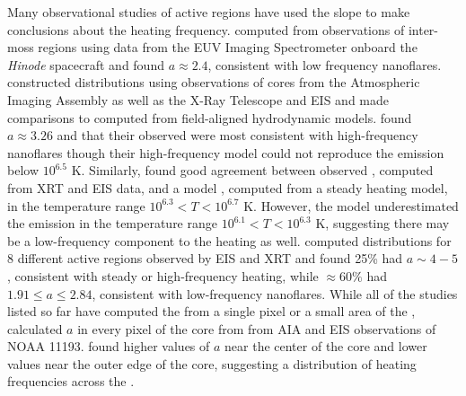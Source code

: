 Many observational studies of active regions have used the \dem{} slope to make conclusions about the heating frequency. \citet{tripathi_emission_2011} computed \dem{} from observations of inter-moss regions using data from the EUV Imaging Spectrometer \citep[EIS,][]{culhane_euv_2007} onboard the \textit{Hinode} spacecraft \citep{kosugi_hinode_2007} and found $a\approx2.4$, consistent with low frequency nanoflares. \citet{warren_constraints_2011} constructed \dem{} distributions using observations of \AR{} cores from the Atmospheric Imaging Assembly \citep[AIA][]{lemen_atmospheric_2012} as well as the X-Ray Telescope \citep[XRT][]{golub_x-ray_2007} and EIS and made comparisons to \dem{} computed from field-aligned hydrodynamic models. \citeauthor{warren_constraints_2011} found $a\approx3.26$ and that their observed \dem{} were most consistent with high-frequency nanoflares though their high-frequency model could not reproduce the emission below $10^{6.5}$ K. Similarly, \citet{winebarger_using_2011} found good agreement between observed \dem{}, computed from XRT and EIS data, and a model \dem{}, computed from a steady heating model, in the temperature range $10^{6.3}<T<10^{6.7}$ K. However, the model \dem{} underestimated the emission in the temperature range $10^{6.1}<T<10^{6.3}$ K, suggesting there may be a low-frequency component to the heating as well. \citet{schmelz_cold_2012} computed \dem{} distributions for 8 different active regions observed by EIS and XRT and found 25\% had $a\sim4-5$, consistent with steady or high-frequency heating, while $\approx60\%$ had $1.91\le a\le2.84$, consistent with low-frequency nanoflares. While all of the studies listed so far have computed the \dem{} from a single pixel or a small area of the \AR{}, \citet{del_zanna_evolution_2015} calculated $a$ in every pixel of the \AR{} core from from AIA and EIS observations of NOAA 11193. \citeauthor{del_zanna_evolution_2015} found higher values of $a$ near the center of the core and lower values near the outer edge of the core, suggesting a distribution of heating frequencies across the \AR{}. 


